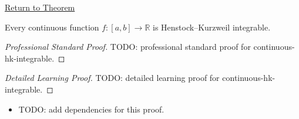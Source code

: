 \newpage
{}
\label{prf:continuous-hk-integrable}
\begin{remark*}[Return]\hyperref[thm:continuous-hk-integrable]{Return to Theorem}\end{remark*}

\begin{theorem*}
Every continuous function \(f:[a,b]\to\mathbb{R}\) is Henstock--Kurzweil
integrable.
\end{theorem*}

\begin{proof}[Professional Standard Proof]
\LRAProofBodyStart
TODO: professional standard proof for continuous-hk-integrable.
\end{proof}

\begin{proof}[Detailed Learning Proof]
\LRAProofBodyStart
TODO: detailed learning proof for continuous-hk-integrable.
\end{proof}

\begin{remark*}
\end{remark*}

\begin{dependencies}
\begin{itemize}
  \item TODO: add dependencies for this proof.
\end{itemize}
\end{dependencies}

\clearpage
